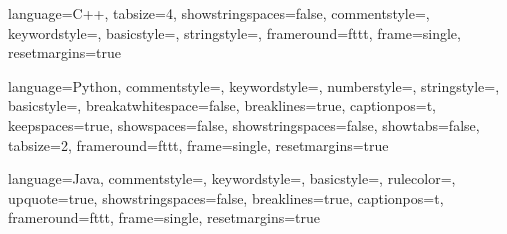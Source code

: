 
\usepackage{upquote} %



\usepackage{scrhack}

\usepackage{listings}

{	language=C++,
	tabsize=4, 
    showstringspaces=false,
    commentstyle=\color{green}\ttfamily,
    keywordstyle=\color{blue},
    basicstyle=\footnotesize, 
    stringstyle=\color{red},
	frameround=fttt,
	frame=single,
	resetmargins=true
}

{	language=Python,
	commentstyle=\color{codegreen},
    keywordstyle=\color{magenta},
    numberstyle=\tiny\color{codegray},
    stringstyle=\color{codepurple},
    basicstyle=\footnotesize,
    breakatwhitespace=false,         
    breaklines=true,                 
    captionpos=t,                    
    keepspaces=true,                 
    showspaces=false,                
    showstringspaces=false,
    showtabs=false,                  
    tabsize=2,
    frameround=fttt,
    frame=single,
    resetmargins=true
}

{	language=Java,
    commentstyle=\color{green}\ttfamily,
    keywordstyle=\color{RoyalBlue},
    basicstyle=\footnotesize,
    rulecolor=\color{black},
    upquote=true,
    showstringspaces=false,
    breaklines=true,
    captionpos=t,                    
    frameround=fttt,
    frame=single,
    resetmargins=true
}

\lstset{language=C++, resetmargins=true}
\lstset{language=Python, resetmargins=true}
\lstset{language=Java, resetmargins=true}

\renewcommand{\lstlistlistingname}{Quellcodeverzeichnis}
\renewcommand{\lstlistingname}{Skript}

